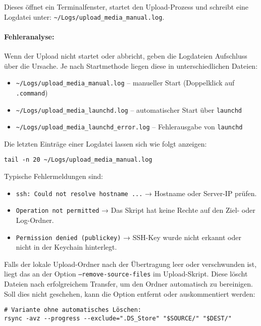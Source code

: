 \documentclass[12pt,a4paper]{report}
\begin{document}
    Dieses öffnet ein Terminalfenster, startet den Upload-Prozess und schreibt eine Logdatei unter:
    \texttt{\textasciitilde/Logs/upload\_media\_manual.log}.

    \paragraph{Fehleranalyse:}
    Wenn der Upload nicht startet oder abbricht, geben die Logdateien Aufschluss über die Ursache.  
    Je nach Startmethode liegen diese in unterschiedlichen Dateien:
    \begin{itemize}
      \item \texttt{\textasciitilde/Logs/upload\_media\_manual.log} – manueller Start (Doppelklick auf \texttt{.command})
      \item \texttt{\textasciitilde/Logs/upload\_media\_launchd.log} – automatischer Start über \texttt{launchd}
      \item \texttt{\textasciitilde/Logs/upload\_media\_launchd\_error.log} – Fehlerausgabe von \texttt{launchd}
    \end{itemize}

    Die letzten Einträge einer Logdatei lassen sich wie folgt anzeigen:
    \begin{verbatim}
tail -n 20 ~/Logs/upload_media_manual.log
    \end{verbatim}

    Typische Fehlermeldungen sind:
    \begin{itemize}
      \item \texttt{ssh: Could not resolve hostname ...} → Hostname oder Server-IP prüfen.
      \item \texttt{Operation not permitted} → Das Skript hat keine Rechte auf den Ziel- oder Log-Ordner.
      \item \texttt{Permission denied (publickey)} → SSH-Key wurde nicht erkannt oder nicht in der Keychain hinterlegt.
    \end{itemize}

    Falls der lokale Upload-Ordner nach der Übertragung leer oder verschwunden ist, liegt das an der Option \texttt{--remove-source-files} im Upload-Skript.  
    Diese löscht Dateien nach erfolgreichem Transfer, um den Ordner automatisch zu bereinigen.  
    Soll dies nicht geschehen, kann die Option entfernt oder auskommentiert werden:
    \begin{verbatim}
# Variante ohne automatisches Löschen:
rsync -avz --progress --exclude=".DS_Store" "$SOURCE/" "$DEST/"
    \end{verbatim}
\end{document}

